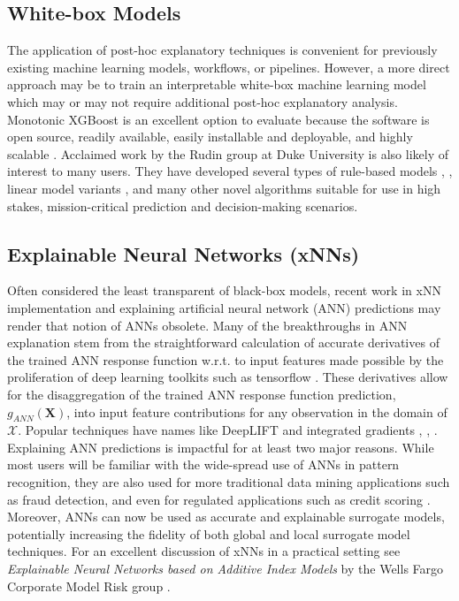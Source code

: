 \documentclass[11pt]{asaproc}
\begin{document}
\subsection{White-box Models}

The application of post-hoc explanatory techniques is convenient for previously existing machine learning models, workflows, or pipelines. However, a more direct approach may be to train an interpretable white-box machine learning model which may or may not require additional post-hoc explanatory analysis. Monotonic XGBoost is an excellent option to evaluate because the software is open source, readily available, easily installable and deployable, and highly scalable \cite{xgboost}. Acclaimed work by the Rudin group at Duke University is also likely of interest to many users. They have developed several types of rule-based models \cite{corels}, \cite{sbrl}, linear model variants \cite{slim}, and many other novel algorithms suitable for use in high stakes, mission-critical prediction and decision-making scenarios. 

\subsection{Explainable Neural Networks (xNNs)}

Often considered the least transparent of black-box models, recent work in xNN implementation and explaining artificial neural network (ANN) predictions may render that notion of ANNs obsolete. Many of the breakthroughs in ANN explanation stem from the straightforward calculation of accurate derivatives of the trained ANN response function w.r.t. to input features made possible by the proliferation of deep learning toolkits such as tensorflow \cite{raissi2017physics}. These derivatives allow for the disaggregation of the trained ANN response function prediction, $g_{ANN}(\mathbf{X})$, into input feature contributions for any observation in the domain of $\mathcal{X}$. Popular techniques have names like DeepLIFT and integrated gradients \cite{deeplift}, \cite{integrated_grads}, \cite{grad_attr}. Explaining ANN predictions is impactful for at least two major reasons. While most users will be familiar with the wide-spread use of ANNs in pattern recognition, they are also used for more traditional data mining applications such as fraud detection, and even for regulated applications such as credit scoring \cite{mli_booklet}. Moreover, ANNs can now be used as accurate and explainable surrogate models, potentially increasing the fidelity of both global and local surrogate model techniques. For an excellent discussion of xNNs in a practical setting see \textit{Explainable Neural Networks based on Additive Index Models} by the Wells Fargo Corporate Model Risk group \cite{wf_xnn}.
\end{document}
